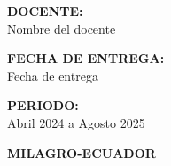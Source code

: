 \begin{titlepage}
{\Large \textbf{DOCENTE:}}\\
\Large Nombre del docente\\
\vspace{0.5cm}

{\Large \textbf{FECHA DE ENTREGA:}}\\
\Large Fecha de entrega\\
\vspace{0.5cm}

{\Large \textbf{PERIODO:}}\\
\Large Abril 2024 a Agosto 2025\\
\vspace{1.5cm}

{\Large \textbf{MILAGRO-ECUADOR}}

\vfill
\noindent
{}

\restoregeometry

\end{titlepage}
